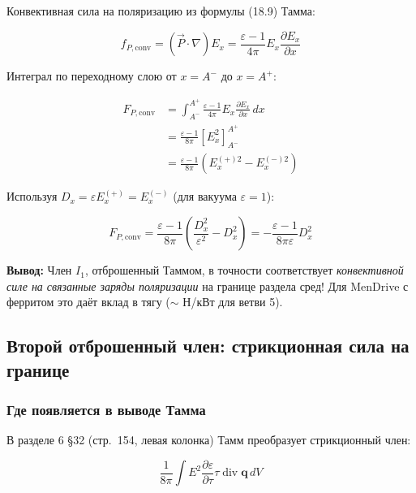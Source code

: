 \documentclass[a4paper,12pt]{article}
\begin{document}
Конвективная сила на поляризацию из формулы (18.9) Тамма:

\begin{equation}
f_{P,\text{conv}} = (\vec{P}\cdot\nabla)E_x =
\frac{\varepsilon-1}{4\pi}E_x\frac{\partial E_x}{\partial x}
\label{eq:convective_force_polarization}
\end{equation}

Интеграл по переходному слою от $x = A^-$ до $x = A^+$:

\begin{equation}
\begin{aligned}
F_{P,\text{conv}} &= \int_{A^-}^{A^+} \frac{\varepsilon-1}{4\pi}E_x\frac{\partial E_x}{\partial x}\,dx \\
&= \frac{\varepsilon-1}{8\pi}\left[E_x^2\right]_{A^-}^{A^+} \\
&= \frac{\varepsilon-1}{8\pi}\left(E_x^{(+)2} - E_x^{(-)2}\right)
\end{aligned}
\label{eq:convective_integrated}
\end{equation}

Используя $D_x = \varepsilon E_x^{(+)} = E_x^{(-)}$ (для вакуума $\varepsilon=1$):

\begin{equation}
F_{P,\text{conv}} = \frac{\varepsilon-1}{8\pi}\left(\frac{D_x^2}{\varepsilon^2} - D_x^2\right) =
-\frac{\varepsilon-1}{8\pi\varepsilon}D_x^2
\label{eq:convective_via_D}
\end{equation}

\textbf{Вывод:} Член $I_1$, отброшенный Таммом, в точности соответствует
\textit{конвективной силе на связанные заряды поляризации} на границе
раздела сред! Для MenDrive с ферритом это даёт вклад в тягу
($\sim $ Н/кВт для ветви 5).

\subsection{Второй отброшенный член: стрикционная сила на границе}

\subsubsection{Где появляется в выводе Тамма}

В разделе 6 §32 (стр.~154, левая колонка) Тамм преобразует стрикционный член:

\begin{equation}
\frac{1}{8\pi}\int E^2\frac{\partial\varepsilon}{\partial\tau}
\tau\operatorname{div}\mathbf{q}\,dV
\label{eq:tamm_integral_2}
\end{equation}
\end{document}
